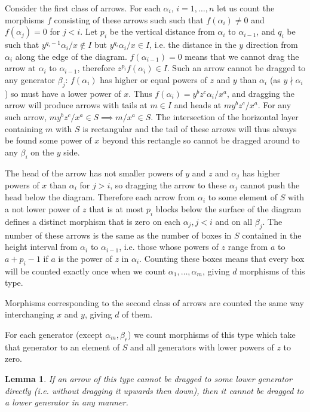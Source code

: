 \documentclass[a4paper,12pt,titlepage]{article}
\newtheorem{lmm}{Lemma}
\begin{document}
Consider the first class of arrows.
For each $\alpha_i$, $i=1, \dots, n$ let us count the morphisms $f$ consisting of these arrows such such that $f(\alpha_i) \neq 0$ and $f(\alpha_j)=0$ for $j<i$.
Let $p_i$ be the vertical distance from $\alpha_i$ to $\alpha_{i-1}$, and $q_i$ be such that $y^{q_i-1}\alpha_i/x \notin I$ but $y^{q_i}\alpha_i/x \in I$,
i.e. the distance in the $y$ direction from $\alpha_i$ along the edge of the diagram. $f(\alpha_{i-1})=0$ means that we cannot drag the arrow at $\alpha_i$ to $\alpha_{i-1}$,
therefore $z^{p_i}f(\alpha_i) \in I$. Such an arrow cannot be dragged to any generator $\beta_j$: 
$f(\alpha_i)$ has higher or equal powers of $z$ and $y$ than $\alpha_i$ (as $y \nmid \alpha_i$) so must have a lower power of $x$. Thus $f(\alpha_i)=y^bz^c\alpha_i/x^a$,
and dragging the arrow will produce arrows with tails at $m \in I$ and heads at $my^bz^c/x^a$. For any such arrow, $my^bz^c/x^a \in S \implies m/x^a \in S$.
The intersection of the horizontal layer containing $m$ with $S$ is rectangular and the tail of these arrows will thus always be found some power of $x$ beyond this rectangle
so cannot be dragged around to any $\beta_i$ on the $y$ side.

The head of the arrow has not smaller powers of $y$ and $z$ and $\alpha_j$ has higher powers of $x$ than $\alpha_i$ for $j>i$,
so dragging the arrow to these $\alpha_j$ cannot push the head below the diagram.
Therefore each arrow from $\alpha_i$ to some element of $S$ with a not lower power of $z$ that is at most $p_i$ blocks below the surface of the diagram
defines a distinct morphism that is zero on each $\alpha_j, j<i$ and on all $\beta_j$.
The number of these arrows is the same as the number of boxes in $S$ contained in the height interval from $\alpha_i$ to $\alpha_{i-1}$,
i.e. those whose powers of $z$ range from $a$ to $a+p_i-1$ if $a$ is the power of $z$ in $\alpha_i$.
Counting these boxes means that every box will be counted exactly once when we count $\alpha_1, \dots, \alpha_m$, giving $d$ morphisms of this type.

Morphisms corresponding to the second class of arrows are counted the same way interchanging $x$ and $y$, giving $d$ of them.

For each generator (except $\alpha_m, \beta_r$) we count morphisms of this type which take that generator to an element of $S$ and all generators with lower powers of $z$ to zero.
\begin{lmm} If an arrow of this type cannot be dragged to some lower generator directly (i.e. without dragging it upwards then down), then it cannot be dragged to a lower generator in any manner.
\end{lmm}
\end{document}
